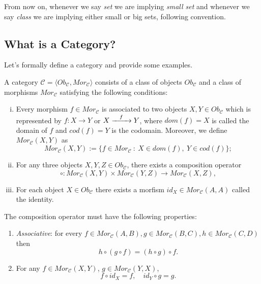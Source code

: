 From now on, whenever we say \textit{set} we are implying \textit{small set}
and whenever we say \textit{class} we are implying either small or big sets,
following \citet{borceux1994handbook} convention.


\subsection{What is a Category?}

Let's formally define a category and provide some examples.

\begin{definition}[Category]
	A category $\mathcal C = \langle Ob_{\mathcal C}, Mor_{\mathcal C} \rangle$ consists
	of a class of objects $Ob_\mathcal C$ and a class of morphisms
	$Mor_\mathcal C$ satisfying the following conditions:
	\begin{enumerate}[(i)]
		\item Every morphism $f \in Mor_\mathcal C$ is associated to two objects $X,Y \in Ob_{\mathcal C}$
		      which is represented by $f:X \to Y$ or $X \xrightarrow{\hspace{3mm}f \hspace{3mm}} Y$,
		      where $dom(f) = X$ is called the domain of $f$ and $cod(f)=Y$ is the codomain. Moreover, we define
		      $Mor_\mathcal C (X,Y)$ as
		      \begin{displaymath}
			      Mor_\mathcal C (X,Y) := \{f \in Mor_\mathcal C \ : \ X \in dom(f), \ Y \in cod(f)\};
		      \end{displaymath}
		\item For any three objects $X,Y, Z \in Ob_\mathcal C$, there exists a composition operator
		      \begin{displaymath}
			      \circ: Mor_\mathcal C (X,Y)   \times Mor_\mathcal C (Y,Z) \to Mor_\mathcal C (X,Z),
		      \end{displaymath}
		\item For each object $X \in Ob_\mathcal C$ there exists a morfism $id_X \in Mor_\mathcal C (A,A)$
		      called the identity.
	\end{enumerate}
	The composition operator must have the following properties:
	\begin{enumerate}[(p.1)]
		\item \textit{Associative}: for every $f \in Mor_\mathcal C (A,B),
			      g \in Mor_\mathcal C (B,C), h \in Mor_\mathcal C (C,D)$ then
		      \begin{displaymath}
			      h \circ (g \circ f) = (h \circ g) \circ f.
		      \end{displaymath}
		\item For any $f \in Mor_\mathcal C (X,Y)$, $g \in Mor_\mathcal C (Y,X)$,
		      \begin{displaymath}
			      f \circ id_X = f,  \quad id_Y \circ g = g.
		      \end{displaymath}
	\end{enumerate}
\end{definition}

